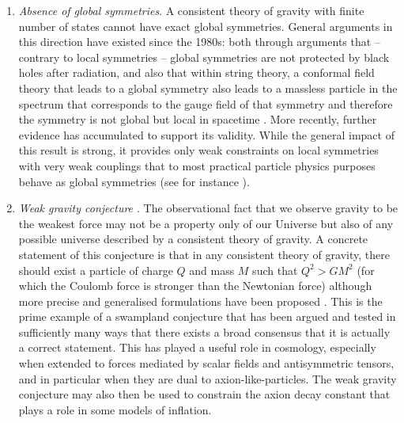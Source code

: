 \begin{enumerate}
\item{\it Absence of global symmetries}. A consistent theory of gravity with finite number of states cannot have exact global symmetries. General arguments in this direction have existed since the 1980s: both through arguments that -- contrary to local symmetries -- global symmetries are not protected by black holes after radiation, and also that within string theory, a conformal field theory that leads to a global symmetry also leads to a massless particle in the spectrum that corresponds to the gauge field of that symmetry and therefore the symmetry is not global but local in spacetime \cite{Banks:1988yz}.  More recently, further evidence has accumulated to support its validity. While the general impact of this result is strong, it provides only weak constraints on local symmetries with very weak couplings that to most practical particle physics purposes behave as global symmetries (see for instance \cite{Burgess:2008ri}).

\item {\it Weak gravity conjecture \cite{Arkani-Hamed:2006emk}}. The observational fact that we observe gravity to be the weakest force may not be a property only of our Universe but also of any possible universe described by a consistent theory of gravity. A concrete statement of this conjecture is that in any consistent theory of gravity, there should exist a particle of charge $Q$ and mass $M$ such that $Q^2>GM^2$ (for which the Coulomb force is stronger than the Newtonian force) although more precise and generalised formulations have been proposed \cite{Harlow:2022gzl}. This is the prime example of a  swampland conjecture  that has been argued and tested in sufficiently many ways that there exists a broad consensus that it is actually a correct statement. This has played a useful role in cosmology, especially when extended to forces mediated by scalar fields and  antisymmetric tensors, and in particular when they are dual to axion-like-particles. The weak gravity conjecture may also then be used to constrain the axion decay constant that plays a role in some models of inflation.


\end{enumerate}
